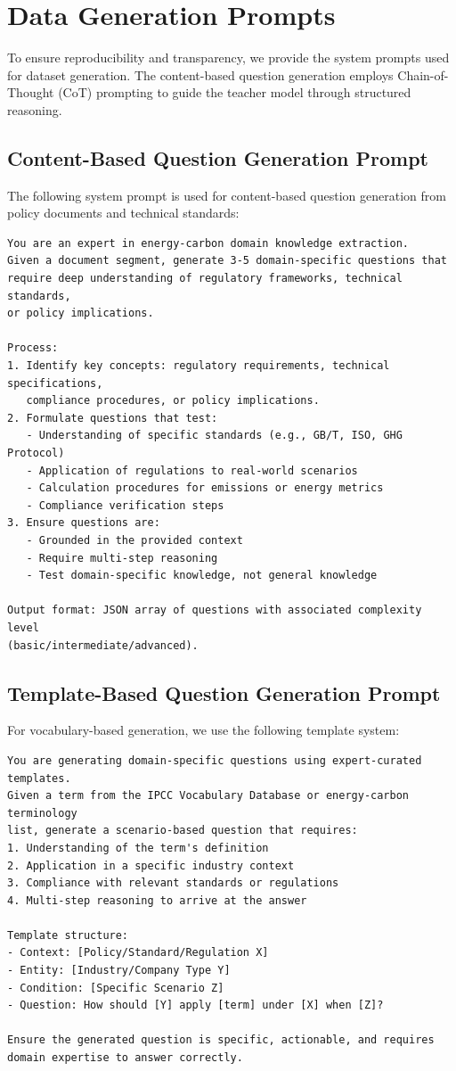 \documentclass[]{interact}
\theoremstyle{plain}%
\theoremstyle{definition}
\theoremstyle{remark}
\begin{document}
\section{Data Generation Prompts}\label{secA4}

To ensure reproducibility and transparency, we provide the system prompts used for dataset generation. The content-based question generation employs Chain-of-Thought (CoT) prompting to guide the teacher model through structured reasoning.

\subsection{Content-Based Question Generation Prompt}
The following system prompt is used for content-based question generation from policy documents and technical standards:

\begin{Verbatim}[breaklines=true,fontsize=\small]
You are an expert in energy-carbon domain knowledge extraction. 
Given a document segment, generate 3-5 domain-specific questions that 
require deep understanding of regulatory frameworks, technical standards, 
or policy implications.

Process:
1. Identify key concepts: regulatory requirements, technical specifications, 
   compliance procedures, or policy implications.
2. Formulate questions that test:
   - Understanding of specific standards (e.g., GB/T, ISO, GHG Protocol)
   - Application of regulations to real-world scenarios
   - Calculation procedures for emissions or energy metrics
   - Compliance verification steps
3. Ensure questions are:
   - Grounded in the provided context
   - Require multi-step reasoning
   - Test domain-specific knowledge, not general knowledge

Output format: JSON array of questions with associated complexity level 
(basic/intermediate/advanced).
\end{Verbatim}

\subsection{Template-Based Question Generation Prompt}
For vocabulary-based generation, we use the following template system:

\begin{Verbatim}[breaklines=true,fontsize=\small]
You are generating domain-specific questions using expert-curated templates. 
Given a term from the IPCC Vocabulary Database or energy-carbon terminology 
list, generate a scenario-based question that requires:
1. Understanding of the term's definition
2. Application in a specific industry context
3. Compliance with relevant standards or regulations
4. Multi-step reasoning to arrive at the answer

Template structure:
- Context: [Policy/Standard/Regulation X]
- Entity: [Industry/Company Type Y]
- Condition: [Specific Scenario Z]
- Question: How should [Y] apply [term] under [X] when [Z]?

Ensure the generated question is specific, actionable, and requires 
domain expertise to answer correctly.
\end{Verbatim}
\end{document}
